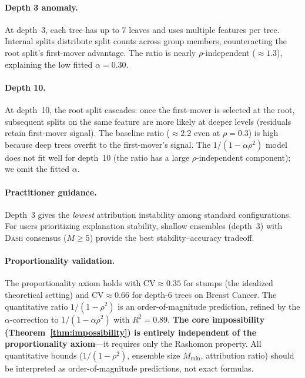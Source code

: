 \documentclass{article}
\newcommand{\DASH}{\textsc{Dash}}
\begin{document}
\paragraph{Depth 3 anomaly.}
At depth~3, each tree has up to 7 leaves and uses multiple features per
tree. Internal splits distribute split counts across group members,
counteracting the root split's first-mover advantage.
The ratio is nearly $\rho$-independent (${\approx}1.3$), explaining the
low fitted $\alpha = 0.30$.

\paragraph{Depth 10.}
At depth~10, the root split cascades: once the first-mover is selected
at the root, subsequent splits on the same feature are more likely at
deeper levels (residuals retain first-mover signal). The baseline ratio
(${\approx}2.2$ even at $\rho{=}0.3$) is high because deep trees
overfit to the first-mover's signal.
The $1/(1{-}\alpha\rho^2)$ model does not fit well for depth~10 (the
ratio has a large $\rho$-independent component); we omit the fitted $\alpha$.

\paragraph{Practitioner guidance.}
Depth~3 gives the \emph{lowest} attribution instability among standard
configurations. For users prioritizing explanation stability, shallow
ensembles (depth~3) with \DASH{} consensus ($M \geq 5$) provide the
best stability--accuracy tradeoff.

\paragraph{Proportionality validation.}
The proportionality axiom holds with CV${\approx}0.35$ for stumps (the idealized theoretical setting) and CV${\approx}0.66$ for depth-6 trees on Breast Cancer. The quantitative ratio $1/(1{-}\rho^2)$ is an order-of-magnitude prediction, refined by the $\alpha$-correction to $1/(1{-}\alpha\rho^2)$ with $R^2 = 0.89$. \textbf{The core impossibility (Theorem~\ref{thm:impossibility}) is entirely independent of the proportionality axiom}---it requires only the Rashomon property. All quantitative bounds ($1/(1{-}\rho^2)$, ensemble size $M_{\min}$, attribution ratio) should be interpreted as order-of-magnitude predictions, not exact formulas.
\end{document}
